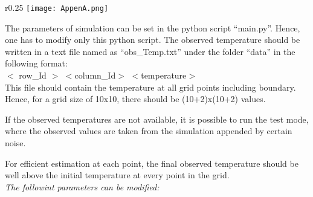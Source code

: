 \documentclass[10pt,a4paper]{report}
\begin{document}
\begin{appendices}
\begin{wrapfigure}{r}{0.25\textwidth} %
    \centering
    \texttt{[image: AppenA.png]}
\end{wrapfigure}
The parameters of simulation can be set in the python script “main.py”. Hence, one has to modify only this python script. The observed temperature should be  written in a text file named as  “obs\_Temp.txt” under the folder “data” in the following format:\\

$<$ row\_Id $>$ \;     $<$column\_Id$>$  \;   $<$temperature$>$\\

This file should contain the temperature at all grid points including boundary. Hence, for a grid size of 10x10, there should be (10+2)x(10+2) values.

If the observed temperatures are not available, it is possible to run the test mode, where the observed values are taken from the simulation appended by certain noise. 

For efficient estimation at each point, the final observed temperature should be well above the initial temperature at every point in the grid. \\
\textit{The followint parameters can be modified:}





\end{appendices}
\end{document}
